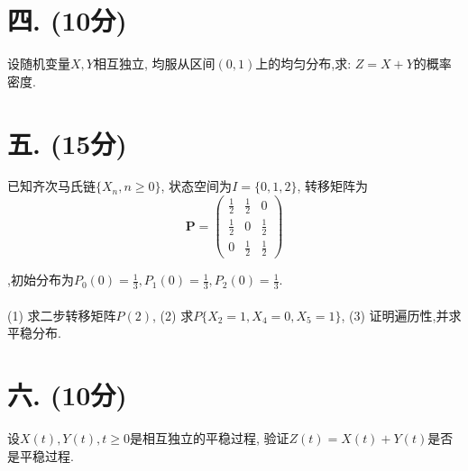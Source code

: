 \documentclass[a4paper,11pt]{article}
\begin{document}
\begin{CJK}{GBK}{song}
\section*{四. (10分)}

设随机变量$X,Y$相互独立, 均服从区间$(0,1)$上的均匀分布,求: $Z=X+Y$的概率密度.

\section*{五. (15分)}

已知齐次马氏链$\{X_n,n\ge 0\}$, 状态空间为$I=\{0,1,2\}$, 转移矩阵为
\renewcommand\arraystretch{1.8}
\[
\mathbf{P}=
\begin{pmatrix}
            \displaystyle{ \frac{1}{2} } & \displaystyle{ \frac{1}{2} } & 0\\
            \displaystyle{ \frac{1}{2} } & 0 & \displaystyle{ \frac{1}{2} }\\
            0 & \displaystyle{ \frac{1}{2} } & \displaystyle{ \frac{1}{2} }
\end{pmatrix}
\]

,初始分布为$\displaystyle{ P_0(0)=\frac{1}{3}, P_1(0)=\frac{1}{3}, P_2(0)=\frac{1}{3} }$. \\
\\
(1) 求二步转移矩阵$P(2)$, (2) 求$P\{X_2=1,X_4=0,X_5=1\}$, (3) 证明遍历性,并求平稳分布.

\section*{六. (10分)}

设$X(t),Y(t),t\ge 0$是相互独立的平稳过程, 验证$Z(t)=X(t)+Y(t)$是否是平稳过程.

\end{CJK}
\end{document}

